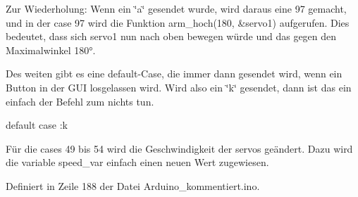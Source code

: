 Zur Wiederholung\+: Wenn ein \char`\"{}a\char`\"{} gesendet wurde, wird daraus eine 97 gemacht, und in der case 97 wird die Funktion arm\+\_\+hoch(180, \&servo1) aufgerufen. Dies bedeutet, dass sich servo1 nun nach oben bewegen würde und das gegen den Maximalwinkel 180°.

Des weiten gibt es eine default-\/\+Case, die immer dann gesendet wird, wenn ein Button in der G\+UI losgelassen wird. Wird also ein \char`\"{}k\char`\"{} gesendet, dann ist das ein einfach der Befehl zum nichts tun.

default case \+:k

Für die cases 49 bis 54 wird die Geschwindigkeit der servos geändert. Dazu wird die variable speed\+\_\+var einfach einen neuen Wert zugewiesen.

Definiert in Zeile 188 der Datei Arduino\+\_\+kommentiert.\+ino.


